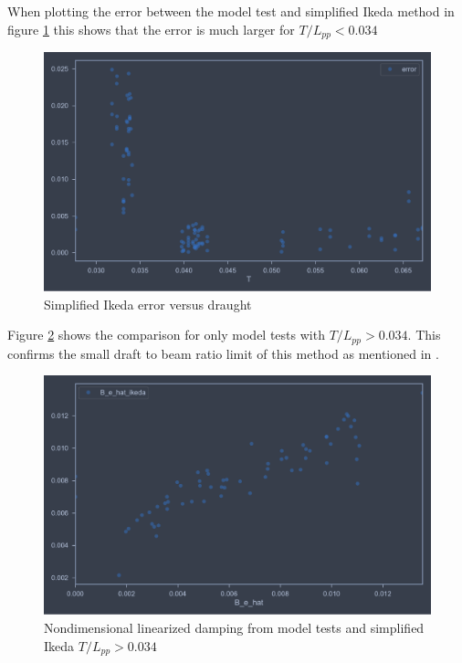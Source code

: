 When plotting the error between the model test and simplified Ikeda method in figure \ref{fig:B_e_hat_error} this shows that the error is much larger for $T/L_{pp}<0.034$

\begin{figure}[H]
    \centering
    \includegraphics[width=\columnwidth]{figures/B_e_hat_error.pdf}
    \caption{Simplified Ikeda error versus draught}
    \label{fig:B_e_hat_error}
\end{figure}

Figure \ref{fig:B_e_hat_good} shows the comparison for only model tests with $T/L_{pp}>0.034$.
This confirms the small draft to beam ratio limit of this method as mentioned in \cite{kawahara_simple_2011}.

\begin{figure}[H]
    \centering
    \includegraphics[width=\columnwidth]{figures/B_e_hat_good.pdf}
    \caption{Nondimensional linearized damping from model tests and simplified Ikeda $T/L_{pp}>0.034$}
    \label{fig:B_e_hat_good}
\end{figure}





